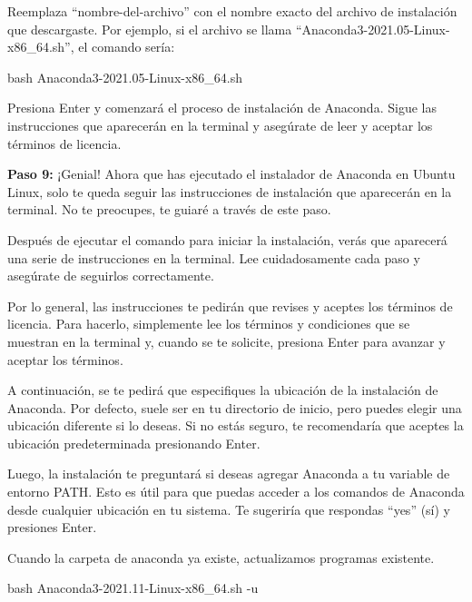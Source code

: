 \documentclass[
  letterpaper,
  DIV=11,
  numbers=noendperiod]{scrartcl}
\newenvironment{Shaded}{}{}
\newcommand{\AttributeTok}[1]{\textcolor[rgb]{0.84,0.23,0.29}{#1}}
\newcommand{\FunctionTok}[1]{\textcolor[rgb]{0.44,0.26,0.76}{#1}}
\newcommand{\NormalTok}[1]{\textcolor[rgb]{0.14,0.16,0.18}{#1}}
\begin{document}
Reemplaza ``nombre-del-archivo'' con el nombre exacto del archivo de
instalación que descargaste. Por ejemplo, si el archivo se llama
``Anaconda3-2021.05-Linux-x86\_64.sh'', el comando sería:

\begin{Shaded}
\begin{Highlighting}[]
\FunctionTok{bash}\NormalTok{ Anaconda3{-}2021.05{-}Linux{-}x86\_64.sh}
\end{Highlighting}
\end{Shaded}

Presiona Enter y comenzará el proceso de instalación de Anaconda. Sigue
las instrucciones que aparecerán en la terminal y asegúrate de leer y
aceptar los términos de licencia.

\textbf{Paso 9:} ¡Genial! Ahora que has ejecutado el instalador de
Anaconda en Ubuntu Linux, solo te queda seguir las instrucciones de
instalación que aparecerán en la terminal. No te preocupes, te guiaré a
través de este paso.

Después de ejecutar el comando para iniciar la instalación, verás que
aparecerá una serie de instrucciones en la terminal. Lee cuidadosamente
cada paso y asegúrate de seguirlos correctamente.

Por lo general, las instrucciones te pedirán que revises y aceptes los
términos de licencia. Para hacerlo, simplemente lee los términos y
condiciones que se muestran en la terminal y, cuando se te solicite,
presiona Enter para avanzar y aceptar los términos.

A continuación, se te pedirá que especifiques la ubicación de la
instalación de Anaconda. Por defecto, suele ser en tu directorio de
inicio, pero puedes elegir una ubicación diferente si lo deseas. Si no
estás seguro, te recomendaría que aceptes la ubicación predeterminada
presionando Enter.

Luego, la instalación te preguntará si deseas agregar Anaconda a tu
variable de entorno PATH. Esto es útil para que puedas acceder a los
comandos de Anaconda desde cualquier ubicación en tu sistema. Te
sugeriría que respondas ``yes'' (sí) y presiones Enter.

Cuando la carpeta de anaconda ya existe, actualizamos programas
existente.

\begin{Shaded}
\begin{Highlighting}[]
\FunctionTok{bash}\NormalTok{ Anaconda3{-}2021.11{-}Linux{-}x86\_64.sh }\AttributeTok{{-}u} 
\end{Highlighting}
\end{Shaded}
\end{document}
